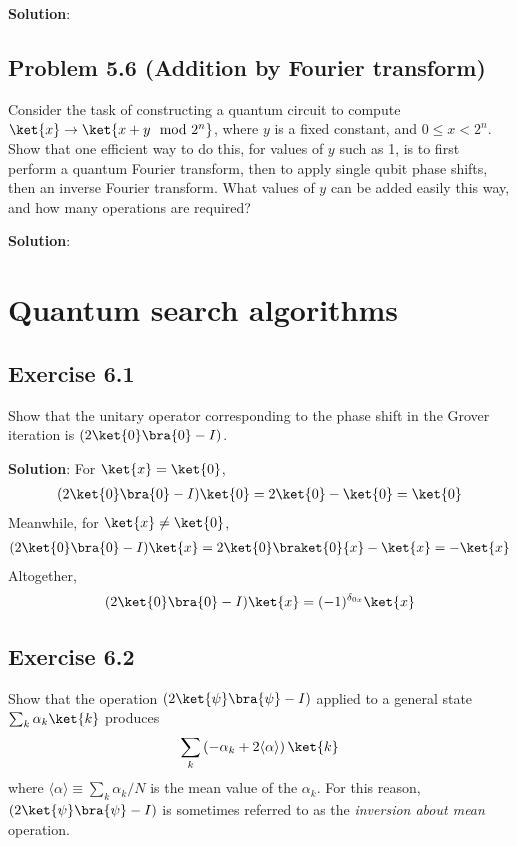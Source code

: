 \documentclass{book}
\begin{document}
    \textbf{Solution}:

\section*{Problem 5.6 (Addition by Fourier transform)}
    Consider the task of constructing a quantum circuit to compute $\ket{x}\rightarrow \ket{x +y \mod 2^n}$, where $y$ is a fixed constant, and $0\leq x < 2^n$. Show that one efficient way to do this, for values of $y$ such as 1, is to first perform a quantum Fourier transform, then to apply single qubit phase shifts, then an inverse Fourier transform. What values of $y$ can be added easily this way, and how many operations are required?
    
    \textbf{Solution}:

\chapter{Quantum search algorithms}

\section*{Exercise 6.1} 
    Show that the unitary operator corresponding to the phase shift in the Grover iteration is $(2\ket{0}\bra{0}-I)$.
    
    \textbf{Solution}: For $\ket{x} = \ket{0}$,
    \begin{align}
        (2\ket{0}\bra{0}-I)\ket{0} = 2\ket{0}-\ket{0} = \ket{0}
    \end{align}
    Meanwhile, for $\ket{x} \neq \ket{0}$,
    \begin{align}
        (2\ket{0}\bra{0}-I)\ket{x} = 2\ket{0}\braket{0}{x}-\ket{x} = -\ket{x}
    \end{align}
    Altogether,
    \begin{align}
        (2\ket{0}\bra{0}-I)\ket{x} = (-1)^{\delta_{0x}}\ket{x}
    \end{align}

\section*{Exercise 6.2}
    Show that the operation $(2\ket{\psi}\bra{\psi}-I)$ applied to a general state $\sum_k \alpha_k \ket{k}$ produces
    \begin{align}
        \sum_k \left(-\alpha_k+2\langle\alpha\rangle\right)\ket{k}
    \end{align}
    where $\langle\alpha\rangle \equiv \sum_k\alpha_k/N$ is the mean value of the $\alpha_k$. For this reason, $(2\ket{\psi}\bra{\psi}-I)$ is sometimes referred to as the \emph{inversion about mean} operation.
    
\end{document}
